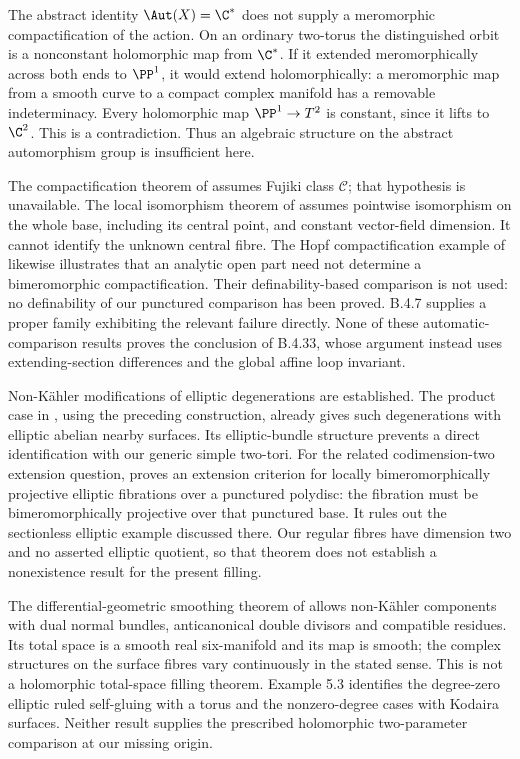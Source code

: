 \begin{remark}
The abstract identity $\Aut(X)=\C^*$ does not supply a
meromorphic compactification of the action. On an ordinary
two-torus the distinguished orbit is a nonconstant holomorphic
map from $\C^*$. If it extended meromorphically across both
ends to $\PP^1$, it would extend holomorphically: a
meromorphic map from a smooth curve to a compact complex
manifold has a removable indeterminacy. Every holomorphic
map $\PP^1\to T^2$ is constant, since it lifts to $\C^2$.
This is a contradiction. Thus an algebraic structure on the
abstract automorphism group is insufficient here.

The compactification theorem of
\citet[Theorem 1.2]{BiliottiGhigi2021Root} assumes Fujiki
class $\mathcal C$; that hypothesis is unavailable.
The local isomorphism theorem of
\citet[Theorem 3]{Meersseman2011Root} assumes pointwise
isomorphism on the whole base, including its central point,
and constant vector-field dimension. It cannot identify the
unknown central fibre. The Hopf compactification example of
\citet[Example 1]{KatzarkovEtAl2025Root} likewise illustrates
that an analytic open part need not determine a bimeromorphic
compactification. Their definability-based comparison is not
used: no definability of our punctured comparison has been
proved. B.4.7 supplies a proper family exhibiting the relevant
failure directly. None of these automatic-comparison results
proves the conclusion of B.4.33, whose argument instead uses
extending-section differences and the global affine loop invariant.

Non-K\"ahler modifications of elliptic degenerations are
established. The product case in
\citet[Section 3, Example 3.4(1)]{Fujimoto1988Root}, using
the preceding construction, already gives such degenerations
with elliptic abelian nearby surfaces. Its elliptic-bundle
structure prevents a direct identification with our generic
simple two-tori. For the related codimension-two extension
question, \citet[Theorem 7.1.3]{Nakayama2002Root} proves an
extension criterion for locally bimeromorphically projective
elliptic fibrations over a punctured polydisc: the fibration
must be bimeromorphically projective over that punctured base.
It rules out the sectionless elliptic example discussed there.
Our regular fibres have dimension two and no asserted elliptic
quotient, so that theorem does not establish a nonexistence
result for the present filling.

The differential-geometric smoothing theorem of
\citet[Theorem 5.5, pp.~882--883]{Doi2009Root} allows
non-K\"ahler components with dual normal bundles,
anticanonical double divisors and compatible residues.
Its total space is a smooth real six-manifold and its
map is smooth; the complex structures on the surface
fibres vary continuously in the stated sense.
This is not a holomorphic total-space filling theorem.
Example 5.3 identifies the degree-zero elliptic ruled
self-gluing with a torus and the nonzero-degree cases
with Kodaira surfaces. Neither result supplies the
prescribed holomorphic two-parameter comparison at our
missing origin.
\end{remark}

